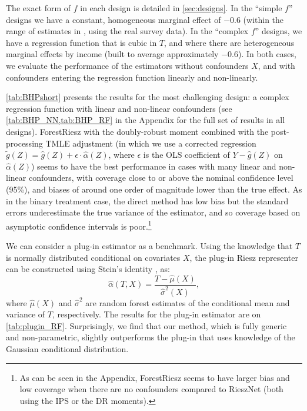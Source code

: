 \documentclass[nohyperref]{article}
\theoremstyle{plain}
\theoremstyle{definition}
\theoremstyle{remark}
\begin{document}
The exact form of $f$ in each design is detailed in \cref{sec:designs}. In the ``simple $f$'' designs we have a constant, homogeneous marginal effect of $-0.6$ (within the range of estimates in \citealp{blundell2012measuring}, using the real survey data). In the ``complex $f$'' designs, we have a regression function that is cubic in $T$, and where there are heterogeneous marginal effects by income (built to average approximately $-0.6$). In both cases, we evaluate the performance of the estimators without confounders $X$, and with confounders entering the regression function linearly and non-linearly.

\cref{tab:BHPshort} presents the results for the most challenging design: a complex regression function with linear and non-linear confounders (see \cref{tab:BHP_NN,tab:BHP_RF} in the Appendix for the full set of results in all designs). ForestRiesz with the doubly-robust moment combined with the post-processing TMLE adjustment (in which we use a corrected regression $\widetilde{g}(Z) = \widehat{g}(Z) + \epsilon \cdot \widehat{\alpha}(Z)$, where $\epsilon$ is the OLS coefficient of $Y - \widehat{g}(Z)$ on $\widehat{\alpha}(Z)$) seems to have the best performance in cases with many linear and non-linear confounders, with coverage close to or above the nominal confidence level (95\%), and biases of around one order of magnitude lower than the true effect. As in the binary treatment case, the direct method has low bias but the standard errors underestimate the true variance of the estimator, and so coverage based on asymptotic confidence intervals is poor.\footnote{As can be seen in the Appendix, ForestRiesz seems to have larger bias and low coverage when there are no confounders compared to RieszNet (both using the IPS or the DR moments).}

We can consider a plug-in estimator as a benchmark. Using the knowledge that $T$ is normally distributed conditional on covariates $X$, the plug-in Riesz representer can be constructed using Stein's identity \citep{lehmann2006theory}, as: $$\widehat{\alpha}(T,X) = \frac{T - \widehat{\mu}(X)}{\widehat{\sigma}^2(X)},$$ where $\widehat{\mu}(X)$ and $\widehat{\sigma}^2$ are random forest estimates of the conditional mean and variance of $T$, respectively. The results for the plug-in estimator are on \cref{tab:plugin_RF}. Surprisingly, we find that our method, which is fully generic and non-parametric, slightly outperforms the plug-in that uses knowledge of the Gaussian conditional distribution.
\end{document}
